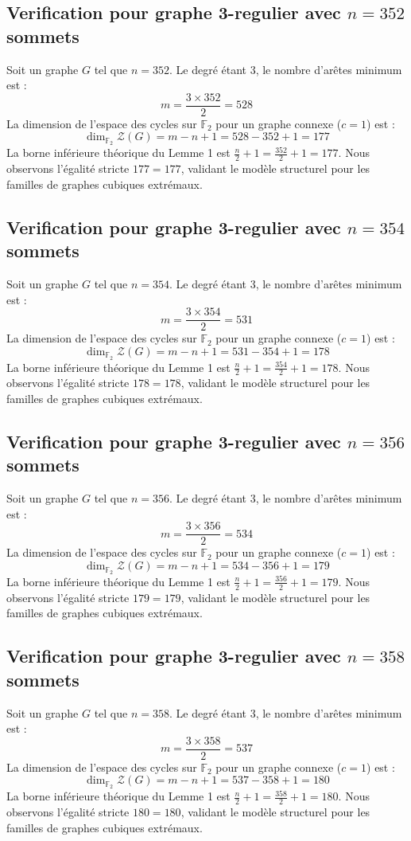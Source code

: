 \documentclass[11pt,a4paper]{article}
\begin{document}
\subsection{Verification pour graphe 3-regulier avec $n=352$ sommets}
Soit un graphe $G$ tel que $n = 352$. Le degré étant 3, le nombre d'arêtes minimum est :
$$ m = \frac{3 \times 352}{2} = 528 $$
La dimension de l'espace des cycles sur $\mathbb{F}_2$ pour un graphe connexe ($c=1$) est :
$$ \dim_{\mathbb{F}_2} \mathcal{Z}(G) = m - n + 1 = 528 - 352 + 1 = 177 $$
La borne inférieure théorique du Lemme 1 est $\frac{n}{2} + 1 = \frac{352}{2} + 1 = 177$.
Nous observons l'égalité stricte $177 = 177$, validant le modèle structurel pour les familles de graphes cubiques extrémaux.

\subsection{Verification pour graphe 3-regulier avec $n=354$ sommets}
Soit un graphe $G$ tel que $n = 354$. Le degré étant 3, le nombre d'arêtes minimum est :
$$ m = \frac{3 \times 354}{2} = 531 $$
La dimension de l'espace des cycles sur $\mathbb{F}_2$ pour un graphe connexe ($c=1$) est :
$$ \dim_{\mathbb{F}_2} \mathcal{Z}(G) = m - n + 1 = 531 - 354 + 1 = 178 $$
La borne inférieure théorique du Lemme 1 est $\frac{n}{2} + 1 = \frac{354}{2} + 1 = 178$.
Nous observons l'égalité stricte $178 = 178$, validant le modèle structurel pour les familles de graphes cubiques extrémaux.

\subsection{Verification pour graphe 3-regulier avec $n=356$ sommets}
Soit un graphe $G$ tel que $n = 356$. Le degré étant 3, le nombre d'arêtes minimum est :
$$ m = \frac{3 \times 356}{2} = 534 $$
La dimension de l'espace des cycles sur $\mathbb{F}_2$ pour un graphe connexe ($c=1$) est :
$$ \dim_{\mathbb{F}_2} \mathcal{Z}(G) = m - n + 1 = 534 - 356 + 1 = 179 $$
La borne inférieure théorique du Lemme 1 est $\frac{n}{2} + 1 = \frac{356}{2} + 1 = 179$.
Nous observons l'égalité stricte $179 = 179$, validant le modèle structurel pour les familles de graphes cubiques extrémaux.

\subsection{Verification pour graphe 3-regulier avec $n=358$ sommets}
Soit un graphe $G$ tel que $n = 358$. Le degré étant 3, le nombre d'arêtes minimum est :
$$ m = \frac{3 \times 358}{2} = 537 $$
La dimension de l'espace des cycles sur $\mathbb{F}_2$ pour un graphe connexe ($c=1$) est :
$$ \dim_{\mathbb{F}_2} \mathcal{Z}(G) = m - n + 1 = 537 - 358 + 1 = 180 $$
La borne inférieure théorique du Lemme 1 est $\frac{n}{2} + 1 = \frac{358}{2} + 1 = 180$.
Nous observons l'égalité stricte $180 = 180$, validant le modèle structurel pour les familles de graphes cubiques extrémaux.
\end{document}
